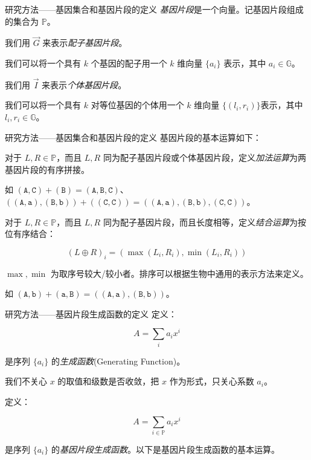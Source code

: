 \documentclass{beamer}
\begin{document}
	\begin{frame}{研究方法——基因集合和基因片段的定义}
		\textsl{基因片段}是一个向量。记基因片段组成的集合为 $\mathbb{P}$。
		
		我们用 $\vec G$ 来表示\textsl{配子基因片段}。
		
		我们可以将一个具有 $k$ 个基因的配子用一个 $k$ 维向量 $\{a_i\}$ 表示，其中 $a_i \in \mathbb{G}$。
		
		我们用 $\vec I$ 来表示\textsl{个体基因片段}。
		
		我们可以将一个具有 $k$ 对等位基因的个体用一个 $k$ 维向量 $\{(l_i,r_i)\}$表示，其中 $l_i,r_i \in \mathbb{G}$。
	\end{frame}

	\begin{frame}{研究方法——基因集合和基因片段的定义}
		基因片段的基本运算如下：
		
		对于 $L,R \in \mathbb{P}$，而且 $L,R$ 同为配子基因片段或个体基因片段，定义\textsl{加法运算}为两基因片段的有序拼接。
		
		如 $(\texttt{A},\texttt{C}) + (\texttt{B}) = (\texttt{A},\texttt{B},\texttt{C})$、$((\texttt{A},\texttt{a}),(\texttt{B},\texttt{b}))+((\texttt{C},\texttt{C}))=((\texttt{A},\texttt{a}),(\texttt{B},\texttt{b}),(\texttt{C},\texttt{C}))$。
		
		对于 $L,R \in \mathbb{P}$，而且 $L,R$ 同为配子基因片段，而且长度相等，定义\textsl{结合运算}为按位有序结合：
		
		$$(L \oplus R)_i=(\max(L_i,R_i),\min(L_i,R_i))$$
		
		$\max,\min$ 为取序号较大/较小者。排序可以根据生物中通用的表示方法来定义。
		
		如 $(\texttt{A},\texttt{b}) + (\texttt{a},\texttt{B})=((\texttt{A},\texttt{a}),(\texttt{B},\texttt{b}))$。
	\end{frame}

	\begin{frame}{研究方法——基因片段生成函数的定义}
		定义：
		
		$$A=\sum_{i} a_i x^{i}$$
		
		是序列 $\{a_i\}$ 的\textsl{生成函数}(Generating Function)。
		
		我们不关心 $x$ 的取值和级数是否收敛，把 $x$ 作为形式，只关心系数 $a_i$。
		
		定义：
		
		$$A=\sum_{i \in \mathbb{P}} a_i x^{i}$$
		
		是序列 $\{a_i\}$ 的\textsl{基因片段生成函数}。以下是基因片段生成函数的基本运算。
	\end{frame}
\end{document}
